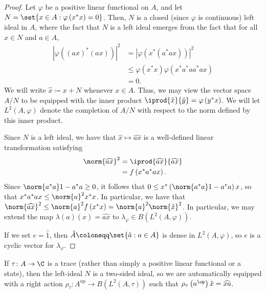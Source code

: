\documentclass[10pt]{mypackage}
\renewcommand{\coloneq}{\coloneqq}
\begin{document}
\begin{proof}
  Let $\varphi$ be a positive linear functional on $A$, and let $N = \set{x\in A : \varphi\left( x^{\ast}x \right) = 0}$. Then, $N$ is a closed (since $\varphi$ is continuous) left ideal in $A$, where the fact that $N$ is a left ideal emerges from the fact that for all $x\in N$ and $a\in A$,
  \begin{align*}
    \left\vert \varphi\left( \left( ax \right)^{\ast}\left( ax \right) \right) \right\vert^2 &= \left\vert \varphi\left( x^{\ast}\left( a^{\ast}ax \right) \right) \right\vert^2\\
                                                                                       &\leq \varphi\left( x^{\ast}x \right)\varphi\left( x^{\ast}a^{\ast}aa^{\ast}ax \right)\\
                                                                                       &= 0.
  \end{align*}
  We will write $\hat{x}\coloneq x + N$ whenever $x\in A$. Thus, we may view the vector space $A/N$ to be equipped with the inner product $ \iprod{\hat{x}}{\hat{y}} = \varphi\left( y^{\ast}x \right) $. We will let $L^2\left( A,\varphi \right)$ denote the completion of $A/N$ with respect to the norm defined by this inner product.

  Since $N$ is a left ideal, we have that $\hat{x}\mapsto \widehat{ax}$ is a well-defined linear transformation satisfying
  \begin{align*}
    \norm{\widehat{ax}}^2 &= \iprod{\widehat{ax}}{\widehat{ax}}\\
                          &= f\left( x^{\ast}a^{\ast}ax \right).
  \end{align*}
  Since $\norm{a^{\ast}a}1 - a^{\ast}a\geq 0$, it follows that $0\leq x^{\ast}\left( \norm{a^{\ast}a}1-a^{\ast}a \right)x$, so that $x^{\ast}a^{\ast}ax\leq \norm{a}^2x^{\ast}x$. In particular, we have that $\norm{\widehat{ax}}^2\leq \norm{a}^2f\left( x^{\ast}x \right) = \norm{a}^2\norm{\hat{x}}^2$. In particular, we may extend the map $\lambda(a)\left( \hat{x} \right) = \widehat{ax}$ to $\lambda_{\varphi}\in B\left( L^2\left( A,\varphi \right) \right)$.

  If we set $e = \hat{1}$, then $\hat{A}\coloneq \set{\hat{a} : a\in A}$ is dense in $L^2\left( A,\varphi \right)$, so $e$ is a cyclic vector for $\lambda_{\varphi}$.
\end{proof}
\begin{remark}
  If $\tau\colon A\to \C$ is a trace (rather than simply a positive linear functional or a state), then the left-ideal $N$ is a two-sided ideal, so we are automatically equipped with a right action $\rho_{\tau}\colon A^{\operatorname{op}}\to B\left( L^2\left( A,\tau \right) \right)$ such that $\rho_{\tau}\left( a^{\op} \right)\hat{x} = \widehat{xa}$.
\end{remark}
\end{document}
